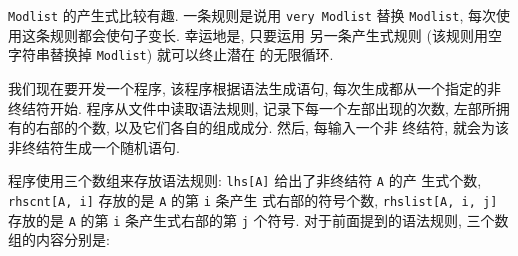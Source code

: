 \texttt{Modlist} 的产生式比较有趣. 一条规则是说用 \texttt{very Modlist}
替换 \texttt{Modlist}, 每次使用这条规则都会使句子变长. 幸运地是, 只要运用
另一条产生式规则 (该规则用空字符串替换掉 \texttt{Modlist}) 就可以终止潜在
的无限循环.

我们现在要开发一个程序, 该程序根据语法生成语句, 每次生成都从一个指定的非
终结符开始. 程序从文件中读取语法规则, 记录下每一个左部出现的次数, 
左部所拥有的右部的个数, 以及它们各自的组成成分. 然后, 每输入一个非
终结符, 就会为该非终结符生成一个随机语句.

程序使用三个数组来存放语法规则:
\texttt{lhs[A]} 给出了非终结符 \texttt{A} 的产 
生式个数, \texttt{rhscnt[A, i]} 存放的是 \texttt{A} 的第 \texttt{i} 条产生
式右部的符号个数, \texttt{rhslist[A, i, j]} 存放的是 \texttt{A} 的第 
\texttt{i} 条产生式右部的第 \texttt{j} 个符号. 对于前面提到的语法规则, 
三个数组的内容分别是:

